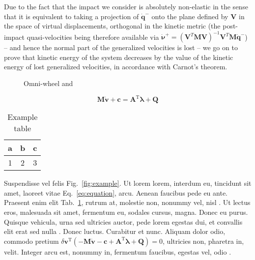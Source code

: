 \documentclass[letterpaper,11pt]{article}
\begin{document}
Due to the fact that the impact we consider is absolutely non-elastic in the sense that it is equivalent to taking a projection of $\dot{\mathbf{q}}^-$ onto the plane defined by $\mathbf{V}$ in the space of virtual displacements, orthogonal in the kinetic metric (the post-impact quasi-velocities being therefore available via $\dot{\mathbf{\nu}}^+ = (\mathbf{V}^T\mathbf{M}\mathbf{V})^{-1}\mathbf{V}^T\mathbf{M}\dot{\mathbf{q}}^-$) -- and hence the normal part of the generalized velocities is lost -- we go on to prove that kinetic energy of the system decreases by the value of the kinetic energy of lost generalized velocities, in accordance with Carnot's theorem.

\newpage

\begin{figure}[h]
  \centering
  \fboxsep 1cm
  \caption{Omni-wheel and }
  \label{fig:WheelVehicle}
\end{figure}

\lipsum[3] %

\begin{equation}
\mathbf{M} \dot{\mathbf{v}} + \mathbf{c} = \mathbf{A}^\mathrm{T} \boldsymbol{\lambda} + \mathbf{Q}
\label{eq:equation}
\end{equation}

\lipsum[4] %
\lipsum[5] %

\begin{table}[h]
  \centering
  \begin{tabular}{|c|c|c|}
    \hline
    a & b & c \\
    \hline
    1 & 2& 3\\
    \hline
  \end{tabular}
  \caption{Example table}
  \label{tab:example}
\end{table}

Suspendisse vel felis Fig.~\ref{fig:example}. Ut lorem lorem, interdum eu, tincidunt sit amet, laoreet vitae Eq.~\eqref{eq:equation}, arcu. Aenean faucibus pede eu ante. Praesent enim elit Tab.~\ref{tab:example}, rutrum at,  molestie non, nonummy vel, nisl \cite{book}. Ut lectus eros, malesuada sit amet, fermentum eu, sodales cursus, magna. Donec eu purus. Quisque vehicula, urna sed ultricies auctor, pede lorem egestas dui, et convallis elit erat sed nulla \cite{article}. Donec luctus. Curabitur et nunc. Aliquam dolor odio, commodo pretium $\delta \mathbf{v}^\mathrm{T} \left( -\mathbf{M} \dot{\mathbf{v}} - \mathbf{c} +   \mathbf{A}^\mathrm{T} \boldsymbol{\lambda} + \mathbf{Q}\right) = 0$, ultricies non, pharetra in, velit. Integer arcu est, nonummy in, fermentum faucibus, egestas vel, odio \cite{conference}.
\end{document}
